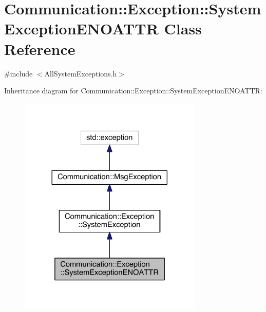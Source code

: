 \hypertarget{class_communication_1_1_exception_1_1_system_exception_e_n_o_a_t_t_r}{}\section{Communication\+:\+:Exception\+:\+:System\+Exception\+E\+N\+O\+A\+T\+T\+R Class Reference}
\label{class_communication_1_1_exception_1_1_system_exception_e_n_o_a_t_t_r}


{\ttfamily \#include $<$All\+System\+Exceptions.\+h$>$}



Inheritance diagram for Communication\+:\+:Exception\+:\+:System\+Exception\+E\+N\+O\+A\+T\+T\+R\+:\nopagebreak
\begin{figure}[H]
\begin{center}
\leavevmode
\includegraphics[width=248pt]{class_communication_1_1_exception_1_1_system_exception_e_n_o_a_t_t_r__inherit__graph}
\end{center}
\end{figure}


